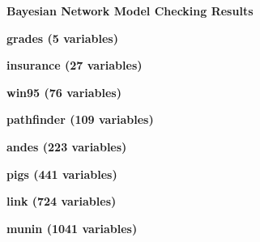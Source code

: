 \documentclass[a4paper,8pt]{article}
\begin{document}
\begin{center}
\Large \textbf{Bayesian Network Model Checking Results}
\end{center}

\vspace{0.3cm}

\noindent
\textbf{\large grades (5 variables)}




\vspace{0.5cm}

\noindent
\textbf{\large insurance (27 variables)}




\vspace{0.5cm}

\noindent
\textbf{\large win95 (76 variables)}




\vspace{0.5cm}

\noindent
\textbf{\large pathfinder (109 variables)}




\vspace{0.5cm}

\noindent
\textbf{\large andes (223 variables)}




\vspace{0.5cm}

\noindent
\textbf{\large pigs (441 variables)}




\vspace{0.5cm}

\noindent
\textbf{\large link (724 variables)}




\vspace{0.5cm}

\noindent
\textbf{\large munin (1041 variables)}




\vspace{0.5cm}

\end{document}
